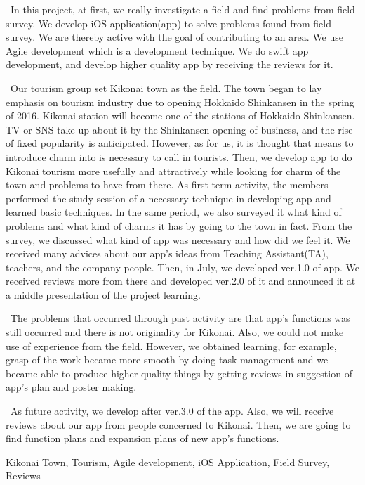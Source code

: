 \begin{eabstract} 

\ In this project, at first, we really investigate a field and find problems from field survey. We develop iOS application(app) to solve problems found from field survey. We are thereby active with the goal of contributing to an area. We use Agile development which is a development technique. We do swift app development, and develop higher quality app by receiving the reviews for it. 

\ Our tourism group set Kikonai town as the field. The town began to lay emphasis on tourism industry due to opening Hokkaido Shinkansen in the spring of 2016. Kikonai station will become one of the stations of Hokkaido Shinkansen. TV or SNS take up about it by the Shinkansen opening of business, and the rise of fixed popularity is anticipated. However, as for us, it is thought that means to introduce charm into is necessary to call in tourists. Then, we develop app to do Kikonai tourism more usefully and attractively while looking for charm of the town and problems to have from there. As first-term activity, the members performed the study session of a necessary technique in developing app and learned basic techniques. In the same period, we also surveyed it what kind of problems and what kind of charms it has by going to the town in fact. From the survey, we discussed what kind of app was necessary and how did we feel it. We received many advices about our app's ideas from Teaching Assistant(TA), teachers, and the company people. Then, in July, we developed ver.1.0 of app. We received reviews more from there and developed ver.2.0 of it and announced it at a middle presentation of the project learning. 

\ The problems that occurred through past activity are that app's functions was still occurred and there is not originality for Kikonai. Also, we could not make use of experience from the field. However, we obtained learning, for example, grasp of the work became more smooth by doing task management and we became able to produce higher quality things by getting reviews in suggestion of app's plan and poster making. 

\ As future activity, we develop after ver.3.0 of the app. Also, we will receive reviews about our app from people concerned to Kikonai. Then, we are going to find function plans and expansion plans of new app's functions.


\begin{ekeyword}
Kikonai Town, Tourism, Agile development, iOS Application, Field Survey, Reviews
\end{ekeyword}
\end{eabstract}